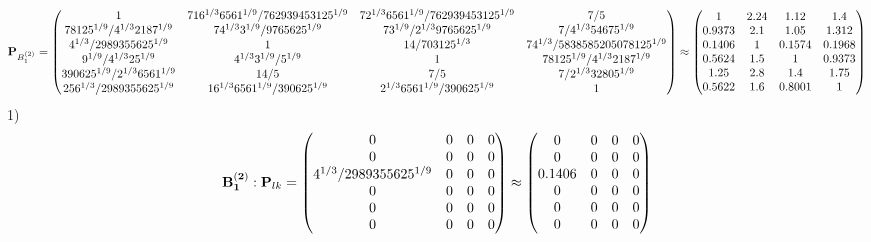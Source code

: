 \documentclass[10pt,a4paper]{article}
\begin{document}
	\[
		\bold{P}_{B_1^{(2)}} = 
		\begin{pmatrix}
			{1}{} & {{7}{16^ {1 / 3}}{6561^ {1 / 9}}} / {{762939453125^ {1 / 9}}} & {{7}{2^ {1 / 3}}{6561^ {1 / 9}}} / {{762939453125^ {1 / 9}}} & {{7}} / {{5}} \\
			{{78125^ {1 / 9}}} / {{4^ {1 / 3}}{2187^ {1 / 9}}} & {{7}{4^ {1 / 3}}{3^ {1 / 9}}} / {{9765625^ {1 / 9}}} & {{7}{3^ {1 / 9}}} / {{2^ {1 / 3}}{9765625^ {1 / 9}}} & {{7}} / {{4^ {1 / 3}}{54675^ {1 / 9}}} \\
			{{4^ {1 / 3}}} / {{2989355625^ {1 / 9}}} & {1}{} & {{14}} / {{703125^ {1 / 3}}} & {{7}{4^ {1 / 3}}} / {{5838585205078125^ {1 / 9}}} \\
			{{9^ {1 / 9}}} / {{4^ {1 / 3}}{25^ {1 / 9}}} & {{4^ {1 / 3}}{3^ {1 / 9}}} / {{5^ {1 / 9}}} & {1}{} & {{78125^ {1 / 9}}} / {{4^ {1 / 3}}{2187^ {1 / 9}}} \\
			{{390625^ {1 / 9}}} / {{2^ {1 / 3}}{6561^ {1 / 9}}} & {{14}} / {{5}} & {{7}} / {{5}} & {{7}} / {{2^ {1 / 3}}{32805^ {1 / 9}}} \\
			{{256^ {1 / 3}}} / {{2989355625^ {1 / 9}}} & {{16^ {1 / 3}}{6561^ {1 / 9}}} / {{390625^ {1 / 9}}} & {{2^ {1 / 3}}{6561^ {1 / 9}}} / {{390625^ {1 / 9}}} & {1}{} \\
		\end{pmatrix}
		\approx
		\begin{pmatrix}
			1        & 2.24     & 1.12     & 1.4      \\
			0.9373   & 2.1      & 1.05     & 1.312    \\
			0.1406   & 1        & 0.1574   & 0.1968   \\
			0.5624   & 1.5      & 1        & 0.9373   \\
			1.25     & 2.8      & 1.4      & 1.75     \\
			0.5622   & 1.6      & 0.8001   & 1        \\
		\end{pmatrix}
	\]
	1)
	\[
		\bold{B_1^{(2)}}: \bold{P}_{lk} = 
		\begin{pmatrix}
			{{0}}{} & {{0}}{} & {{0}}{} & {{0}}{} \\
			{{0}}{} & {{0}}{} & {{0}}{} & {{0}}{} \\
			{{4^ {1 / 3}}} / {{2989355625^ {1 / 9}}} & {{0}}{} & {{0}}{} & {{0}}{} \\
			{{0}}{} & {{0}}{} & {{0}}{} & {{0}}{} \\
			{{0}}{} & {{0}}{} & {{0}}{} & {{0}}{} \\
			{{0}}{} & {{0}}{} & {{0}}{} & {{0}}{} \\
		\end{pmatrix}
		\approx
		\begin{pmatrix}
			0        & 0        & 0        & 0        \\
			0        & 0        & 0        & 0        \\
			0.1406   & 0        & 0        & 0        \\
			0        & 0        & 0        & 0        \\
			0        & 0        & 0        & 0        \\
			0        & 0        & 0        & 0        \\
		\end{pmatrix}
	\]
\end{document}
